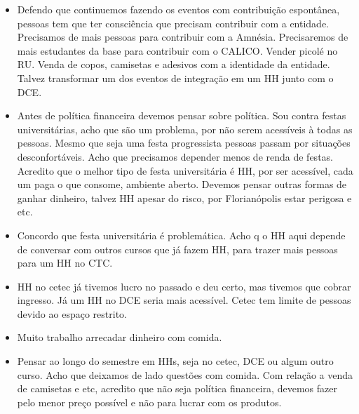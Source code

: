 \documentclass{ata-calico}
\begin{document}
\begin{itemize}
\item Defendo que continuemos fazendo os eventos com contribuição espontânea,
  pessoas tem que ter consciência que precisam contribuir com a entidade.
  Precisamos de mais pessoas para contribuir com a Amnésia. Precisaremos de
  mais estudantes da base para contribuir com o CALICO.  Vender picolé no RU.
  Venda de copos, camisetas e adesivos com a identidade da entidade. Talvez
  transformar um dos eventos de integração em um HH junto com o DCE.
\item Antes de política financeira devemos pensar sobre política. Sou contra festas
  universitárias, acho que são um problema, por não serem acessíveis à todas as
  pessoas. Mesmo que seja uma festa progressista pessoas passam por situações
  desconfortáveis. Acho que precisamos depender menos de renda de festas.
  Acredito que o melhor tipo de festa universitária é HH, por ser acessível,
  cada um paga o que consome, ambiente aberto.  Devemos pensar outras formas de
  ganhar dinheiro, talvez HH apesar do risco, por Florianópolis estar perigosa e etc.
\item Concordo que festa universitária é problemática. Acho q o HH aqui depende de
  conversar com outros cursos que já fazem HH, para trazer mais pessoas para um
  HH no CTC.
\item HH no cetec já tivemos lucro no passado e deu certo, mas tivemos que cobrar
  ingresso. Já um HH no DCE seria mais acessível.  Cetec tem limite de pessoas
  devido ao espaço restrito.
\item Muito trabalho arrecadar dinheiro com comida.
\item Pensar ao longo do semestre em HHs, seja no cetec, DCE ou algum outro curso.
  Acho que deixamos de lado questões com comida.  Com relação a venda de
  camisetas e etc, acredito que não seja política financeira, devemos fazer
  pelo menor preço possível e não para lucrar com os produtos.
\end{itemize}
\end{document}
